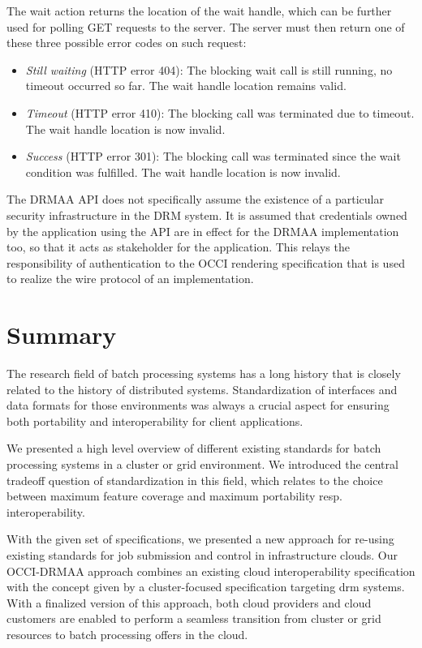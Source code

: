 \documentclass[twocolumn]{svjour3}       %
\begin{document}
The wait action returns the location of the wait handle, which can be further used for polling GET requests to the server. The server must then return one of these three possible error codes on such request:

\begin{itemize}
\item \emph{Still waiting} (HTTP error 404): The blocking wait call is still running, no timeout occurred so far. The wait handle location remains valid.
\item \emph{Timeout} (HTTP error 410): The blocking call was terminated due to timeout. The wait handle location is now invalid.
\item \emph{Success} (HTTP error 301): The blocking call was terminated since the wait condition was fulfilled. The wait handle location is now invalid.
\end{itemize}

The DRMAA API does not specifically assume the existence of a particular security infrastructure in the DRM system. It is assumed that credentials owned by the application using the API are in effect for the DRMAA implementation too, so that it acts as stakeholder for the application. This relays the responsibility of authentication to the OCCI rendering specification that is used to realize the wire protocol of an implementation. 

\section{Summary}

The research field of batch processing systems has a long history that is closely related to the history of distributed systems. Standardization of interfaces and data formats for those environments was always a crucial aspect for ensuring both portability and interoperability for client applications.

We presented a high level overview of different existing standards for batch processing systems in a cluster or grid environment. We introduced the central tradeoff question of standardization in this field, which relates to the choice between maximum feature coverage and maximum portability resp. interoperability. 

With the given set of specifications, we presented a new approach for re-using existing standards for job submission and control in infrastructure clouds. Our OCCI-DRMAA approach combines an existing cloud interoperability specification with the concept given by a cluster-focused specification targeting \gls{drm} systems. With a finalized version of this approach, both cloud providers and cloud customers are enabled to perform a seamless transition from cluster or grid resources to batch processing offers in the cloud. 

\printglossaries


\end{document}
